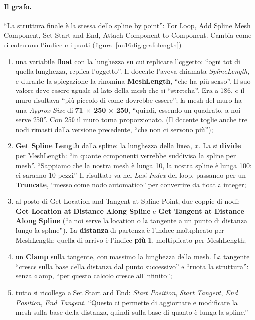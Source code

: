 \paragraph{Il grafo.} ``La struttura finale è la stessa dello spline by point'': For Loop,
Add Spline Mesh Component, Set Start and End, Attach Component to Component. Cambia come si
calcolano l'indice e i punti (figura~\ref{ue16:fig:grafolength}):
\begin{enumerate}
  \item una variabile \textbf{float} con la lunghezza su cui replicare l'oggetto: ``ogni tot di
        quella lunghezza, replica l'oggetto''. Il docente l'aveva chiamata \emph{SplineLength},
        e durante la spiegazione la rinomina \textbf{MeshLength}, ``che ha più senso''. Il suo
        valore deve essere uguale al lato della mesh che si ``stretcha''. Era a 186, e il muro
        risultava ``più piccolo di come dovrebbe essere''; la mesh del muro ha una
        \emph{Approx Size} di \textbf{71 $\times$ 250 $\times$ 250}, ``quindi, essendo un
        quadrato, a noi serve 250''. Con 250 il muro torna proporzionato. (Il docente toglie
        anche tre nodi rimasti dalla versione precedente, ``che non ci servono più'');
  \item \textbf{Get Spline Length} dalla spline: la lunghezza della linea, $x$. La si
        \textbf{divide} per MeshLength: ``in quante componenti verrebbe suddivisa la spline per
        mesh''. ``Sappiamo che la nostra mesh è lunga 10, la nostra spline è lunga 100: ci saranno
        10 pezzi.'' Il risultato va nel \emph{Last Index} del loop, passando per un
        \textbf{Truncate}, ``messo come nodo automatico'' per convertire da float a integer;
  \item al posto di Get Location and Tangent at Spline Point, due coppie di nodi:
        \textbf{Get Location at Distance Along Spline} e \textbf{Get Tangent at Distance Along
        Spline} (``a noi serve la location o la tangente a un punto di distanza lungo la
        spline''). La \textbf{distanza} di partenza è l'indice moltiplicato per MeshLength; quella
        di arrivo è l'indice \textbf{più 1}, moltiplicato per MeshLength;
  \item un \textbf{Clamp} sulla tangente, con massimo la lunghezza della mesh. La tangente
        ``cresce sulla base della distanza dal punto successivo'' e ``ruota la struttura'':
        senza clamp, ``per questo calcolo cresce all'infinito'';
  \item tutto si ricollega a Set Start and End: \emph{Start Position}, \emph{Start Tangent},
        \emph{End Position}, \emph{End Tangent}. ``Questo ci permette di aggiornare e
        modificare la mesh sulla base della distanza, quindi sulla base di quanto è lunga la
        spline.''
\end{enumerate}

